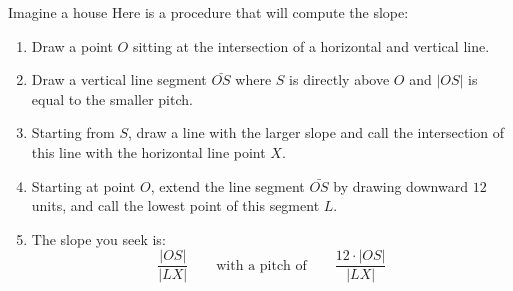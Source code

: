 \documentclass[handout,nooutcomes,noauthor]{ximera}
\begin{document}
\begin{question}
  Imagine a house
  Here is a procedure that will compute the slope:
  \begin{enumerate}
  \item Draw a point $O$ sitting at the intersection of a horizontal
    and vertical line.
  \item Draw a vertical line segment $\bar{OS}$ where $S$ is directly
    above $O$ and $|OS|$ is equal to the smaller pitch.
  \item Starting from $S$, draw a line with the larger slope and call
    the intersection of this line with the horizontal line point $X$.
  \item Starting at point $O$, extend the line segment $\bar{OS}$ by
    drawing downward $12$ units, and call the lowest point of this
    segment $L$.
  \item The slope you seek is:
    \[
    \frac{|OS|}{|LX|}\qquad \text{with a pitch of} \qquad \frac{12\cdot |OS|}{|LX|}
    \]  
  \end{enumerate}
        \begin{center}
      \end{center}
\end{question}

\mynewpage


\begin{question}
  
\end{question}
\end{document}
